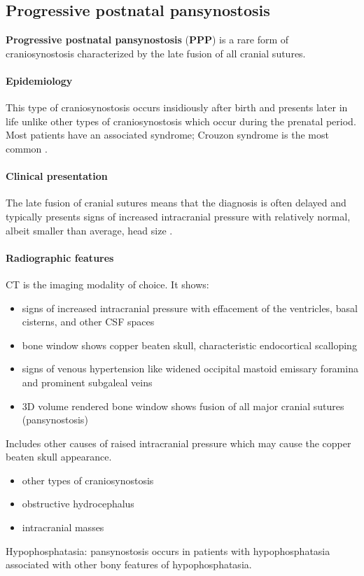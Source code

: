 \subsection{Progressive postnatal pansynostosis}

\textbf{Progressive postnatal pansynostosis} (\textbf{PPP}) is a rare form of craniosynostosis characterized by the late fusion of all cranial sutures.

\paragraph{Epidemiology}

This type of craniosynostosis occurs insidiously after birth and presents later in life unlike other types of craniosynostosis which occur during the prenatal period. Most patients have an associated syndrome; Crouzon syndrome is the most common .

\paragraph{Clinical presentation}

The late fusion of cranial sutures means that the diagnosis is often delayed and typically presents signs of increased intracranial pressure with relatively normal, albeit smaller than average, head size .

\paragraph{Radiographic features}

CT is the imaging modality of choice. It shows:

\begin{itemize}
	\item
	signs of increased intracranial pressure with effacement of the ventricles, basal cisterns, and other CSF spaces
	\item
	bone window shows copper beaten skull, characteristic endocortical scalloping
	\item
	signs of venous hypertension like widened occipital mastoid emissary foramina and prominent subgaleal veins
	\item
	3D volume rendered bone window shows fusion of all major cranial sutures (pansynostosis)
\end{itemize}

\begin{tcolorbox}[colback=green!5!white,colframe=green!75!white,title=Differential diagnosis]
Includes other causes of raised intracranial pressure which may cause the copper beaten skull appearance.

\begin{itemize}
	\item
	other types of craniosynostosis
	\item
	obstructive hydrocephalus
	\item
	intracranial masses
\end{itemize}

Hypophosphatasia: pansynostosis occurs in patients with hypophosphatasia associated with other bony features of hypophosphatasia.
\end{tcolorbox}

